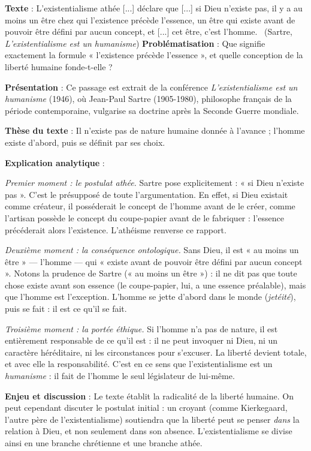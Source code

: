 \documentclass[11pt]{article}
\begin{document}
\begin{exoresolu}
\textbf{Texte} : \guillemotleft L'existentialisme athée [...] déclare que [...] si Dieu n'existe pas, il y a au moins un être chez qui l'existence précède l'essence, un être qui existe avant de pouvoir être défini par aucun concept, et [...] cet être, c'est l'homme. \guillemotright\ (Sartre, \emph{L'existentialisme est un humanisme})
\tcblower
\textbf{Problématisation} : Que signifie exactement la formule « l'existence précède l'essence », et quelle conception de la liberté humaine fonde-t-elle ?

\textbf{Présentation} : Ce passage est extrait de la conférence \emph{L'existentialisme est un humanisme} (1946), où Jean-Paul Sartre (1905-1980), philosophe français de la période contemporaine, vulgarise sa doctrine après la Seconde Guerre mondiale.

\textbf{Thèse du texte} : Il n'existe pas de nature humaine donnée à l'avance ; l'homme existe d'abord, puis se définit par ses choix.

\textbf{Explication analytique} :

\emph{Premier moment : le postulat athée.} Sartre pose explicitement : « si Dieu n'existe pas ». C'est le présupposé de toute l'argumentation. En effet, si Dieu existait comme créateur, il posséderait le concept de l'homme avant de le créer, comme l'artisan possède le concept du coupe-papier avant de le fabriquer : l'essence précéderait alors l'existence. L'athéisme renverse ce rapport.

\emph{Deuxième moment : la conséquence ontologique.} Sans Dieu, il est « au moins un être » — l'homme — qui « existe avant de pouvoir être défini par aucun concept ». Notons la prudence de Sartre (« au moins un être ») : il ne dit pas que toute chose existe avant son essence (le coupe-papier, lui, a une essence préalable), mais que l'homme est l'exception. L'homme se jette d'abord dans le monde (\emph{jetéité}), puis se fait : il est ce qu'il se fait.

\emph{Troisième moment : la portée éthique.} Si l'homme n'a pas de nature, il est entièrement responsable de ce qu'il est : il ne peut invoquer ni Dieu, ni un caractère héréditaire, ni les circonstances pour s'excuser. La liberté devient totale, et avec elle la responsabilité. C'est en ce sens que l'existentialisme est un \emph{humanisme} : il fait de l'homme le seul législateur de lui-même.

\textbf{Enjeu et discussion} : Le texte établit la radicalité de la liberté humaine. On peut cependant discuter le postulat initial : un croyant (comme Kierkegaard, l'autre père de l'existentialisme) soutiendra que la liberté peut se penser \emph{dans} la relation à Dieu, et non seulement dans son absence. L'existentialisme se divise ainsi en une branche chrétienne et une branche athée.


\end{exoresolu}
\end{document}
